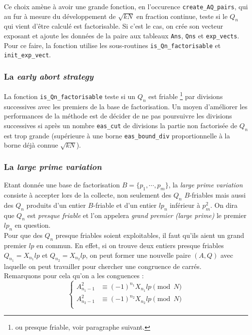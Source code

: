 Ce choix amène à avoir une grande fonction, en l'occurence 
\texttt{create\_AQ\_pairs}, qui au fur à mesure du développement de $\sqrt{kN}$
en fraction continue, teste si le $Q_n$ qui vient d'être calculé est factorisable.
Si c'est le cas, on crée son vecteur exposant et ajoute les données de la paire
aux tableaux \texttt{Ans}, \texttt{Qns} et \texttt{exp\_vects}. Pour ce faire, la
fonction utilise les sous-routines \texttt{is\_Qn\_factorisable} et 
\texttt{init\_exp\_vect}.

\subsubsection{La \textit{early abort strategy}}

La fonction \texttt{is\_Qn\_factorisable} teste si un $Q_n$ est friable 
\footnote {ou presque friable, voir paragraphe suivant.} par divisions successives
avec les premiers de la base de factorisation.  Un moyen d'améliorer les 
performances de la méthode est de décider de ne pas poursuivre les divisions 
successives si après un nombre \texttt{eas\_cut} de divisions la partie non
factorisée de $Q_n$ est trop grande (supérieure à une borne 
\texttt{eas\_bound\_div} proportionnelle à la borne déjà connue $\sqrt{kN}$). 

\subsubsection{La \textit{large prime variation }}

Etant donnée une base de factorisation $B = \{ p_1, \cdots, p_m\}$, la \textit{large
prime variation } consiste à accepter lors de la collecte, non seulement des 
$Q_n$ $B$-friables mais aussi des $Q_n$ produits d'un entier $B$-friable et d'un
entier $lp_n$ inférieur à $p_m^2$. On dira que $Q_n$ est \emph{presque friable}
et l'on appelera \emph{grand premier (large prime)} le premier $lp_n$ en question. \\

Pour que des $Q_n$ presque friables soient exploitables, il faut qu'ils aient
un grand premier $lp$ en commun. En effet, si on trouve deux entiers presque
friables $Q_{n_1} = X_{n_1}lp $ et $Q_{n_2} =  X_{n_2}lp $, on peut former une
nouvelle paire $(A,Q)$ avec laquelle on peut travailler pour chercher une 
congruence de carrés. \\ 

Remarquons pour cela qu'on a les conguences :
\begin{equation*}
  \left\{
      \begin{aligned}
          A_{n_1 -1}^2 &\equiv (-1)^{n_1} X_{n_1}lp\pmod{N} \\
          A_{n_2 -1}^2 &\equiv (-1)^{n_2} X_{n_2}lp\pmod{N}\\
        \end{aligned}
    \right.
\end{equation*}

